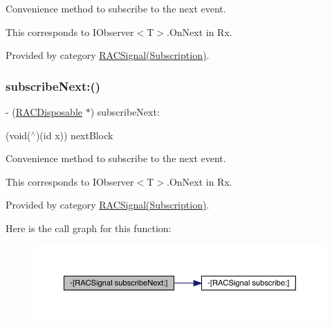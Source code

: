 Convenience method to subscribe to the {\ttfamily next} event.

This corresponds to {\ttfamily I\+Observer$<$T$>$.On\+Next} in Rx. 

Provided by category \mbox{\hyperlink{category_r_a_c_signal_07_subscription_08_a50d000f05e61411c438e616475deb7f8}{R\+A\+C\+Signal(\+Subscription)}}.

\mbox{\label{interface_r_a_c_signal_a50d000f05e61411c438e616475deb7f8}} 
\subsubsection{\texorpdfstring{subscribe\+Next\+:()}{subscribeNext:()}\hspace{0.1cm}{\footnotesize\ttfamily [2/3]}}
{\footnotesize\ttfamily -\/ (\mbox{\hyperlink{interface_r_a_c_disposable}{R\+A\+C\+Disposable}} $\ast$) subscribe\+Next\+: \begin{DoxyParamCaption}\item[{(void($^\wedge$)(id x))}]{next\+Block }\end{DoxyParamCaption}}

Convenience method to subscribe to the {\ttfamily next} event.

This corresponds to {\ttfamily I\+Observer$<$T$>$.On\+Next} in Rx. 

Provided by category \mbox{\hyperlink{category_r_a_c_signal_07_subscription_08_a50d000f05e61411c438e616475deb7f8}{R\+A\+C\+Signal(\+Subscription)}}.

Here is the call graph for this function\+:\nopagebreak
\begin{figure}[H]
\begin{center}
\leavevmode
\includegraphics[width=350pt]{interface_r_a_c_signal_a50d000f05e61411c438e616475deb7f8_cgraph}
\end{center}
\end{figure}
\mbox{\label{interface_r_a_c_signal_a50d000f05e61411c438e616475deb7f8}} 
